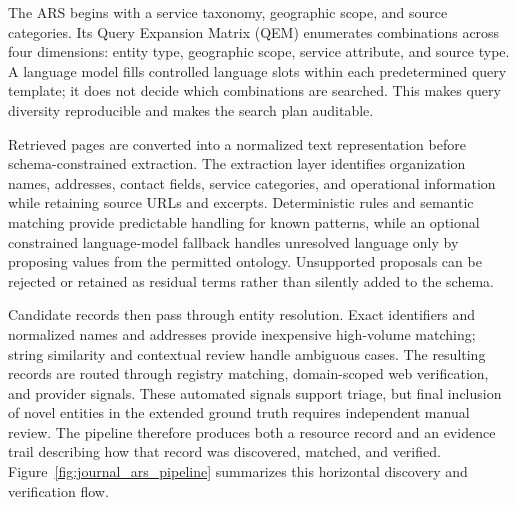 \documentclass[journal,article,submit,moreauthors]{Definitions/mdpi}
\begin{document}
The ARS begins with a service taxonomy, geographic scope, and source categories. Its Query Expansion Matrix (QEM) enumerates combinations across four dimensions: entity type, geographic scope, service attribute, and source type. A language model fills controlled language slots within each predetermined query template; it does not decide which combinations are searched. This makes query diversity reproducible and makes the search plan auditable.

Retrieved pages are converted into a normalized text representation before schema-constrained extraction. The extraction layer identifies organization names, addresses, contact fields, service categories, and operational information while retaining source URLs and excerpts. Deterministic rules and semantic matching provide predictable handling for known patterns, while an optional constrained language-model fallback handles unresolved language only by proposing values from the permitted ontology. Unsupported proposals can be rejected or retained as residual terms rather than silently added to the schema.

Candidate records then pass through entity resolution. Exact identifiers and normalized names and addresses provide inexpensive high-volume matching; string similarity and contextual review handle ambiguous cases. The resulting records are routed through registry matching, domain-scoped web verification, and provider signals. These automated signals support triage, but final inclusion of novel entities in the extended ground truth requires independent manual review. The pipeline therefore produces both a resource record and an evidence trail describing how that record was discovered, matched, and verified. Figure~\ref{fig:journal_ars_pipeline} summarizes this horizontal discovery and verification flow.
\end{document}
